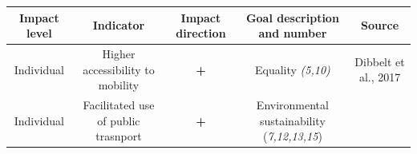 \documentclass[
]{book}
\begin{document}
\begin{longtable}[]{@{}ccccc@{}}
\toprule
\begin{minipage}[b]{0.17\columnwidth}\centering
Impact level\strut
\end{minipage} & \begin{minipage}[b]{0.16\columnwidth}\centering
Indicator\strut
\end{minipage} & \begin{minipage}[b]{0.17\columnwidth}\centering
Impact direction\strut
\end{minipage} & \begin{minipage}[b]{0.17\columnwidth}\centering
Goal description and number\strut
\end{minipage} & \begin{minipage}[b]{0.17\columnwidth}\centering
Source\strut
\end{minipage}\tabularnewline
\midrule
\endhead
\begin{minipage}[t]{0.17\columnwidth}\centering
Individual\strut
\end{minipage} & \begin{minipage}[t]{0.16\columnwidth}\centering
Higher accessibility to mobility\strut
\end{minipage} & \begin{minipage}[t]{0.17\columnwidth}\centering
\textbf{+}\strut
\end{minipage} & \begin{minipage}[t]{0.17\columnwidth}\centering
Equality \emph{(5,10)}\strut
\end{minipage} & \begin{minipage}[t]{0.17\columnwidth}\centering
Dibbelt et al., 2017\strut
\end{minipage}\tabularnewline
\begin{minipage}[t]{0.17\columnwidth}\centering
Individual\strut
\end{minipage} & \begin{minipage}[t]{0.16\columnwidth}\centering
Facilitated use of public trasnport\strut
\end{minipage} & \begin{minipage}[t]{0.17\columnwidth}\centering
\textbf{+}\strut
\end{minipage} & \begin{minipage}[t]{0.17\columnwidth}\centering
Environmental sustainability (\emph{7,12,13,15})\strut
\end{minipage} & \begin{minipage}[t]{0.17\columnwidth}\centering

\end{minipage}
\end{longtable}
\end{document}
